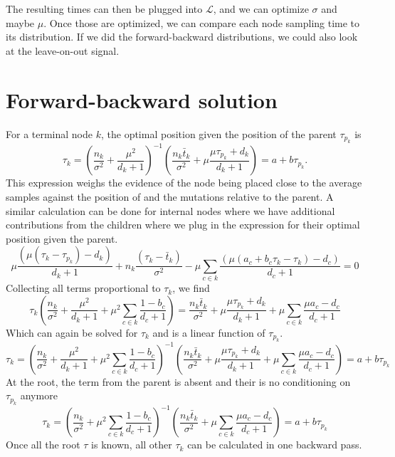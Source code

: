 \documentclass[aps,rmp, onecolumn]{revtex4}
\newcommand{\LH}{\mathcal{L}}
\begin{document}
The resulting times can then be plugged into $\LH$, and we can optimize $\sigma$ and maybe $\mu$.
Once those are optimized, we can compare each node sampling time to its distribution.
If we did the forward-backward distributions, we could also look at the leave-on-out signal.



\section*{Forward-backward solution}
For a terminal node $k$, the optimal position given the position of the parent $\tau_{p_k}$ is
\begin{equation}
\tau_k =  \left(\frac{n_k}{\sigma^2} + \frac{\mu^2}{d_k+1}\right)^{-1}\left(\frac{n_k \bar{t}_k}{\sigma^2} + \mu\frac{\mu\tau_{p_k} + d_k}{d_k+1}\right) = a + b\tau_{p_k}.
\end{equation}
This expression weighs the evidence of the node being placed close to the average samples against the position of and the mutations relative to the parent.
A similar calculation can be done for internal nodes where we have additional contributions from the children where we plug in the expression for their optimal position given the parent.
\begin{equation}
    \mu\frac{(\mu(\tau_k - \tau_{p_k}) -  d_k)}{d_k+1} +  n_k\frac{(\tau_k-\bar{t}_k)}{\sigma^2} -  \mu\sum_{c\in k} \frac{(\mu(a_c + b_c \tau_{k} - \tau_{k}) - d_c)}{d_c+1} = 0
\end{equation}
Collecting all terms proportional to $\tau_k$, we find
\begin{equation}
\tau_k\left(\frac{n_k}{\sigma^2} + \frac{\mu^2}{d_k+1} + \mu^2\sum_{c\in k} \frac{1-b_c}{d_c+1}\right) =
\frac{n_k \bar{t}_k}{\sigma^2} + \mu\frac{\mu\tau_{p_k} + d_k}{d_k+1} + \mu \sum_{c\in k}\frac{\mu a_c - d_c}{d_c+1}
\end{equation}
Which can again be solved for $\tau_k$ and is a linear function of $\tau_{p_k}$.
\begin{equation}
    \tau_k =\left(\frac{n_k}{\sigma^2} + \frac{\mu^2}{d_k+1} + \mu^2\sum_{c\in k} \frac{1-b_c}{d_c+1}\right)^{-1}\left(
    \frac{n_k \bar{t}_k}{\sigma^2} + \mu\frac{\mu\tau_{p_k} + d_k}{d_k+1} + \mu \sum_{c\in k}\frac{\mu a_c - d_c}{d_c+1}\right) = a + b \tau_{p_k}
\end{equation}
At the root, the term from the parent is absent and their is no conditioning on $\tau_{p_k}$ anymore
\begin{equation}
    \tau_k =\left(\frac{n_k}{\sigma^2} + \mu^2\sum_{c\in k} \frac{1-b_c}{d_c+1}\right)^{-1}\left(
    \frac{n_k \bar{t}_k}{\sigma^2} + \mu \sum_{c\in k}\frac{\mu a_c - d_c}{d_c+1}\right) = a + b \tau_{p_k}
\end{equation}
Once all the root $\tau$ is known, all other $\tau_k$ can be calculated in one backward pass.
\end{document}
